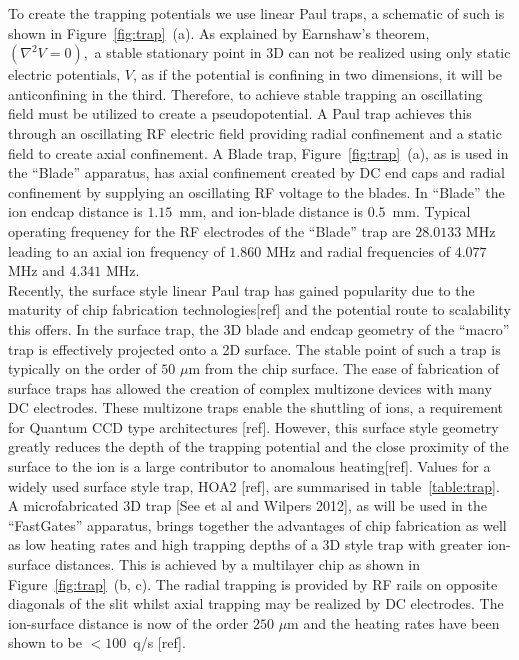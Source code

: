 \documentclass[12pt]{iopart}
\begin{document}
To create the trapping potentials we use linear
Paul traps, a schematic of such is shown in
Figure~\ref{fig:trap}~(a). As explained by Earnshaw's theorem,
$(\nabla^2 V = 0),$
a stable stationary point in 3D can not be realized using only static
electric potentials, $V$, as if the potential is confining in two
dimensions, it will be anticonfining in the third. Therefore, to
achieve stable trapping an oscillating field must be utilized to create a pseudopotential.
A Paul trap achieves this through an oscillating RF electric field
providing radial confinement and a static field to create axial
confinement.
A Blade trap, Figure~\ref{fig:trap}~(a), as is used in the ``Blade''
apparatus, has axial confinement created by DC end caps and radial
confinement by supplying an oscillating RF voltage to the blades. In
``Blade'' the ion endcap distance is $1.15$~mm, and ion-blade distance
is $0.5$~mm. Typical operating frequency for the RF electrodes of the
``Blade'' trap are $28.0133$ MHz leading to an axial ion frequency of
$1.860$ MHz and radial frequencies of $4.077$ MHz and $4.341$
MHz.\\ Recently, the surface style linear Paul trap has gained
popularity due to the maturity of chip fabrication technologies[ref]
and the potential route to scalability this offers. In the surface
trap, the 3D blade and endcap geometry of the ``macro'' trap is
effectively projected onto a 2D surface. The stable point of such a
trap is typically on the order of $50$ $\mu$m from the chip
surface. The ease of fabrication of surface traps has allowed the
creation of complex multizone devices with many DC electrodes.  These
multizone traps enable the shuttling of ions, a requirement for
Quantum CCD type architectures [ref]. However, this surface style
geometry greatly reduces the depth of the trapping potential and the
close proximity of the surface to the ion is a large contributor to
anomalous heating[ref]. Values for a widely used surface style trap, HOA2
[ref], are summarised in table~\ref{table:trap}.\\
A microfabricated 3D trap [See et al and Wilpers 2012], as will be
used in the ``FastGates'' apparatus, brings together the advantages of
chip fabrication as well as low heating rates and high trapping
depths of a 3D style trap with greater ion-surface distances. This is
achieved by a multilayer chip as shown in Figure~\ref{fig:trap}~(b,
c). The radial trapping is provided by RF rails on opposite diagonals
of the slit whilst axial trapping may be realized by DC
electrodes. The ion-surface distance is now of the order $250$ $\mu$m and
the heating rates have been shown to be $< 100$~q/s [ref]. 
\end{document}

